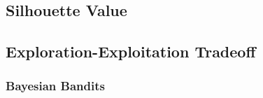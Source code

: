 \subsection{Silhouette Value}
\label{additional:ml:general:silhouette}

\subsection{Exploration-Exploitation Tradeoff}
\label{additional:ml:general:EE_tradeoff}
 
\subsubsection{Bayesian Bandits}
\label{additional:ml:general:EE_tradeoff:BB}
